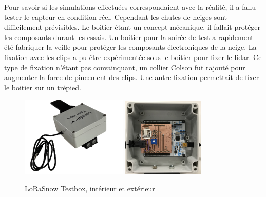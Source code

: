 Pour savoir si les simulations effectuées correspondaient avec la réalité, il a fallu tester le capteur 
en condition réel. Cependant les chutes de neiges sont difficilement prévisibles. Le boitier étant un 
concept mécanique, il fallait protéger les composants durant les essais. Un boitier pour la soirée de 
test a rapidement été fabriquer la veille pour protéger les composants électroniques de la neige. La 
fixation avec les clips a pu être expérimentée sous le boitier pour fixer le lidar. Ce type de fixation 
n’étant pas convainquant, un collier Colson fut rajouté pour augmenter la force de pincement des clips. 
Une autre fixation permettait de fixer le boitier sur un trépied.

\begin{figure}[H]
    \centering
    \includegraphics[width=0.45\textwidth]{Images/photos_PGA/TestBox-removebg-preview.png}
    \includegraphics[width=0.35\textwidth]{Images/photos_PGA/testboxinside.jpg}
    \caption{LoRaSnow Testbox, intérieur et extérieur}
    \label{fig:testbox}
\end{figure}

